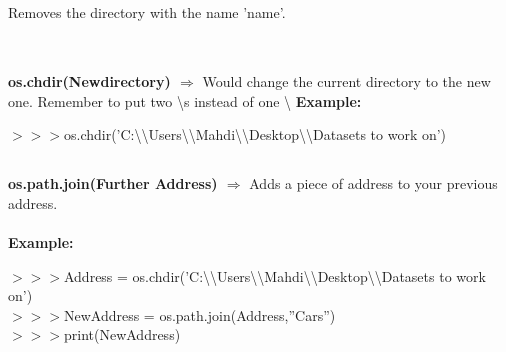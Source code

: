 \documentclass[a4paper,18pt]{article}
\begin{document}

\subsection{\colorbox {matgreen}{\color{white}{\large os.removedirs('name')}}}
Removes the directory with the name 'name'.\\\\


\subsection{\colorbox {matgreen}{\color{white}{\large os.chdir(Newdirectory)}}}
\textbf{os.chdir(Newdirectory) $\Rightarrow$} Would change the current directory to the new one. Remember to put two \textbackslash s instead of one \textbackslash
\textbf{Example:\\}

$>>>$os.chdir('C:\textbackslash\textbackslash Users\textbackslash\textbackslash Mahdi\textbackslash\textbackslash Desktop\textbackslash\textbackslash Datasets to work on')\\


\subsection{\colorbox {matgreen}{\color{white}{\large os.path.join(Further Address)}}}
\textbf{os.path.join(Further Address) $\Rightarrow$} Adds a piece of address to your previous address.\\\\
\textbf{Example:\\}

$>>>$Address = os.chdir('C:\textbackslash\textbackslash Users\textbackslash\textbackslash Mahdi\textbackslash\textbackslash Desktop\textbackslash\textbackslash Datasets to work on')\\

$>>>$NewAddress = os.path.join(Address,''Cars'')\\

$>>>$print(NewAddress)\\
\end{document}
